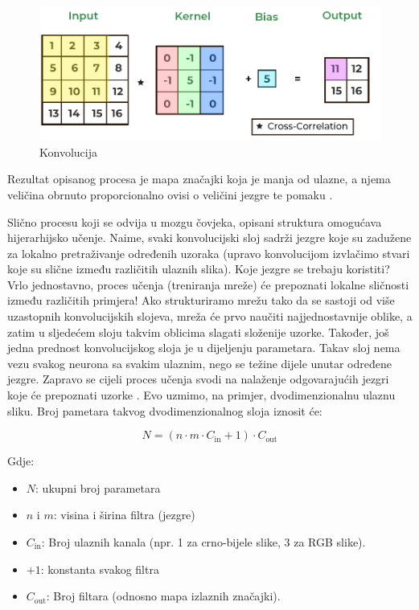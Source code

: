 \begin{figure}[htb]
      \centering
      \includegraphics[width=0.5\linewidth]{Chapters/neuronska_mreza/CNN/convolution.png} 
      \caption{Konvolucija \cite{convolution}}
      \label{pic:convolution}
\end{figure}

Rezultat opisanog procesa je mapa značajki koja je manja od ulazne, a njema veličina
obrnuto proporcionalno ovisi o veličini jezgre te pomaku \cite{cnn_whatis}. 

Slično procesu koji se odvija u mozgu čovjeka, opisani struktura omogućava hijerarhijsko učenje.
Naime, svaki konvolucijski sloj sadrži jezgre koje su zadužene za lokalno pretraživanje
određenih uzoraka (upravo konvolucijom izvlačimo stvari koje su slične između različitih
ulaznih slika). Koje jezgre se trebaju koristiti? Vrlo jednostavno, proces učenja (treniranja
mreže) će prepoznati lokalne sličnosti između različitih primjera! Ako strukturiramo mrežu
tako da se sastoji od više uzastopnih konvolucijskih slojeva, mreža će prvo naučiti najjednostavnije
oblike, a zatim u sljedećem sloju takvim oblicima slagati složenije uzorke. Također,
još jedna prednost konvolucijskog sloja je u dijeljenju parametara. Takav sloj nema vezu 
svakog neurona sa svakim ulaznim, nego se težine dijele unutar određene jezgre. Zapravo se
cijeli proces učenja svodi na nalaženje odgovarajućih jezgri koje će prepoznati uzorke \cite{pycodemates}.
Evo uzmimo, na primjer, dvodimenzionalnu ulaznu sliku. Broj pametara takvog dvodimenzionalnog
sloja iznosit će:

\begin{equation}
    N = (n \cdot m \cdot C_{\text{in}} + 1) \cdot C_{\text{out}}
\end{equation}

Gdje:
\begin{itemize}
    \item \(N\): ukupni broj parametara
    \item \(n\) i \(m\): visina i širina filtra (jezgre)
    \item \(C_{\text{in}}\): Broj ulaznih kanala (npr. 1 za crno-bijele slike, 3 za RGB slike).
    \item \(+1\): konstanta svakog filtra
    \item \(C_{\text{out}}\): Broj filtara (odnosno mapa izlaznih značajki).
\end{itemize}

